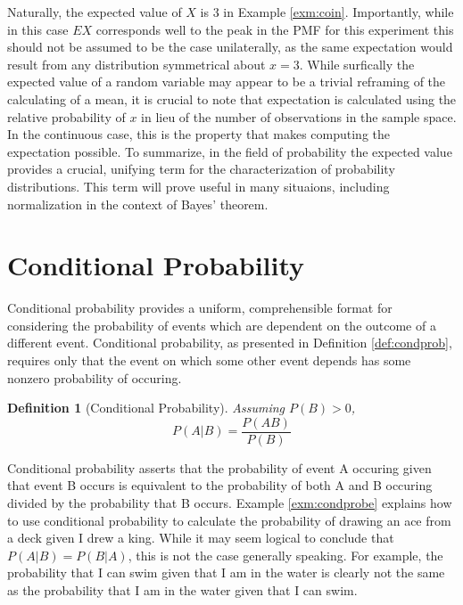 \documentclass[
  12pt,
]{book}
\theoremstyle{definition}
\newtheorem{definition}{Definition}[chapter]
\theoremstyle{definition}
\theoremstyle{definition}
\theoremstyle{remark}
\begin{document}
Naturally, the expected value of \(X\) is 3 in Example \ref{exm:coin}.
Importantly, while in this case \(EX\) corresponds well to the peak in the PMF for this experiment this should not be assumed to be the case unilaterally, as the same expectation would result from any distribution symmetrical about \(x=3\).
While surfically the expected value of a random variable may appear to be a trivial reframing of the calculating of a mean, it is crucial to note that expectation is calculated using the relative probability of \(x\) in lieu of the number of observations in the sample space.
In the continuous case, this is the property that makes computing the expectation possible.
To summarize, in the field of probability the expected value provides a crucial, unifying term for the characterization of probability distributions.
This term will prove useful in many situaions, including normalization in the context of Bayes' theorem.

\hypertarget{conditional-probability}{%
\section{Conditional Probability}\label{conditional-probability}}

Conditional probability provides a uniform, comprehensible format for considering the probability of events which are dependent on the outcome of a different event. Conditional probability, as presented in Definition \ref{def:condprob}, requires only that the event on which some other event depends has some nonzero probability of occuring.

\begin{definition}[Conditional Probability]
\protect\hypertarget{def:condprob}{}{\label{def:condprob} {} }\emph{Assuming \(P(B)>0\),}
\[P(A|B)=\frac{P(AB)}{P(B)}\]
\end{definition}

Conditional probability asserts that the probability of event A occuring given that event B occurs is equivalent to the probability of both A and B occuring divided by the probability that B occurs. Example \ref{exm:condprobe} explains how to use conditional probability to calculate the probability of drawing an ace from a deck given I drew a king. While it may seem logical to conclude that \(P(A|B)=P(B|A)\), this is not the case generally speaking.
For example, the probability that I can swim given that I am in the water is clearly not the same as the probability that I am in the water given that I can swim.
\end{document}

